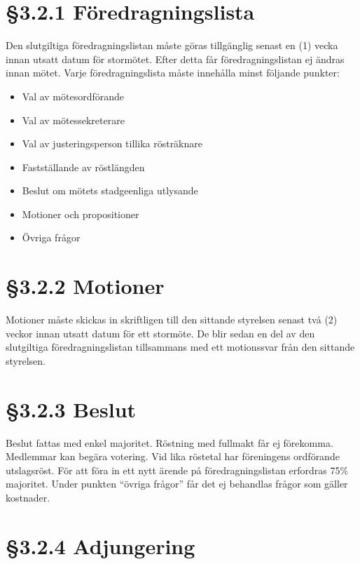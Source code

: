 \documentclass[]{article}
\providecommand{\tightlist}{%
  \setlength{\itemsep}{0pt}\setlength{\parskip}{0pt}}
\begin{document}
\section{§3.2.1 Föredragningslista}\label{fuxf6redragningslista}

Den slutgiltiga föredragningslistan måste göras tillgänglig senast en
(1) vecka innan utsatt datum för stormötet. Efter detta får
föredragningslistan ej ändras innan mötet. Varje föredragningslista
måste innehålla minst följande punkter:

\begin{itemize}
\tightlist
\item
  Val av mötesordförande
\item
  Val av mötessekreterare
\item
  Val av justeringsperson tillika rösträknare
\item
  Fastställande av röstlängden
\item
  Beslut om mötets stadgeenliga utlysande
\item
  Motioner och propositioner
\item
  Övriga frågor
\end{itemize}

\section{§3.2.2 Motioner}\label{motioner}

Motioner måste skickas in skriftligen till den sittande styrelsen senast
två (2) veckor innan utsatt datum för ett stormöte. De blir sedan en del
av den slutgiltiga föredragningslistan tillsammans med ett motionssvar
från den sittande styrelsen.

\section{§3.2.3 Beslut}\label{beslut}

Beslut fattas med enkel majoritet. Röstning med fullmakt får ej
förekomma. Medlemmar kan begära votering. Vid lika röstetal har
föreningens ordförande utslagsröst. För att föra in ett nytt ärende på
föredragningslistan erfordras 75\% majoritet. Under punkten ``övriga
frågor'' får det ej behandlas frågor som gäller kostnader.

\section{§3.2.4 Adjungering}\label{adjungering}
\end{document}

